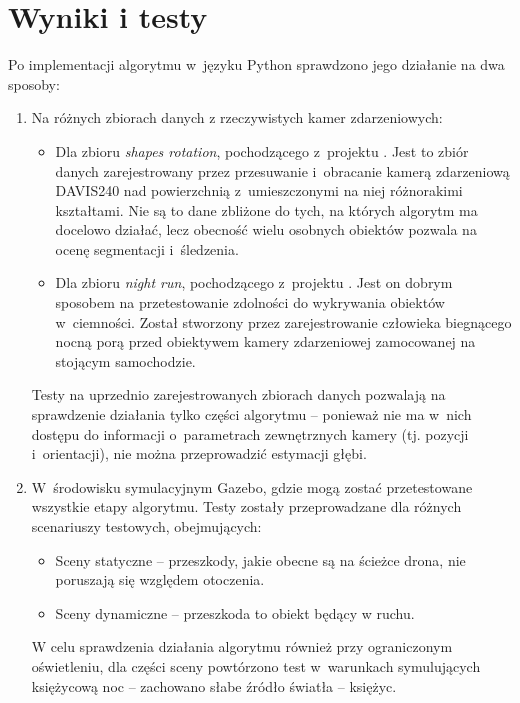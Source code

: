 \chapter{Wyniki i testy}
\label{cha:wyniki}


Po implementacji algorytmu w~języku Python sprawdzono jego działanie na dwa sposoby:
\begin{enumerate}
    \item Na różnych zbiorach danych z rzeczywistych kamer zdarzeniowych:
    \begin{itemize}
        \item Dla zbioru \textit{shapes rotation}, pochodzącego z~projektu \cite{dvs_dataset}. Jest to zbiór danych zarejestrowany przez przesuwanie i~obracanie kamerą zdarzeniową DAVIS240 nad powierzchnią z~umieszczonymi na niej różnorakimi kształtami. Nie są to dane zbliżone do tych, na których algorytm ma docelowo działać, lecz obecność wielu osobnych obiektów pozwala na ocenę segmentacji i~śledzenia.
        \item Dla zbioru \textit{night run}, pochodzącego z~projektu \cite{night_run}. Jest on dobrym sposobem na przetestowanie zdolności do wykrywania obiektów w~ciemności. Został stworzony przez zarejestrowanie człowieka biegnącego nocną porą przed obiektywem kamery zdarzeniowej zamocowanej na stojącym samochodzie.
    \end{itemize}
    Testy na uprzednio zarejestrowanych zbiorach danych pozwalają na sprawdzenie działania tylko części algorytmu -- ponieważ nie ma w~nich dostępu do informacji o~parametrach zewnętrznych kamery (tj. pozycji i~orientacji), nie można przeprowadzić estymacji głębi.
    \item W~środowisku symulacyjnym Gazebo, gdzie mogą zostać przetestowane wszystkie etapy algorytmu. Testy zostały przeprowadzane dla różnych scenariuszy testowych, obejmujących:
    \begin{itemize}
        \item Sceny statyczne -- przeszkody, jakie obecne są na ścieżce drona, nie poruszają się względem otoczenia.
        \item Sceny dynamiczne -- przeszkoda to obiekt będący w ruchu.
    \end{itemize}
    W celu sprawdzenia działania algorytmu również przy ograniczonym oświetleniu, dla części sceny powtórzono test w~warunkach symulujących księżycową noc -- zachowano słabe źródło światła -- księżyc.
\end{enumerate}

